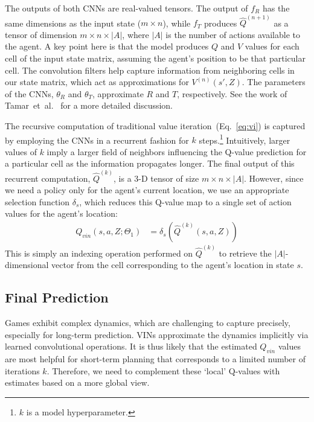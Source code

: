 The outputs of both CNNs are real-valued tensors. The output of $f_R$ has the same dimensions as the input state  ($m \times n$), while $f_T$ produces $\hat{Q}^{(n+1)}$ as a tensor of dimension $m \times n \times |A|$, where $|A|$ is the number of actions available to the agent. A key point here is that the model produces $Q$ and $V$ values for each cell of the input state matrix, assuming the agent's position to be that particular cell. The convolution filters help capture information from neighboring cells in our state matrix, which act as approximations for $V^{(n)}(s', Z)$. The parameters of the CNNs, $\theta_R$ and $\theta_T$, approximate $R$ and $T$, respectively. See the work of  Tamar~et~al.~\citeyear{tamar2016value} for a more detailed discussion.

The recursive computation of traditional value iteration~(Eq.~\ref{eq:vi}) is captured by employing the CNNs in a recurrent fashion for $k$ steps.\footnote{$k$ is a model hyperparameter.} Intuitively, larger values of $k$ imply a larger field of neighbors influencing the Q-value prediction for a particular cell as the information propagates longer. The final output of this recurrent computation, $\hat{Q}^{(k)}$, is a 3-D tensor of size $m \times n \times |A|$. However, since we need a policy only for the agent's current location, we use an appropriate selection function $\delta_s$, which reduces this Q-value map to a single set of action values for the agent's location:
\begin{align}
Q_{vin}(s, a, Z; \Theta_1) &=  \delta_s (\hat{Q}^{(k)} (s, a, Z))
\end{align}
This is simply an indexing operation performed on $\hat{Q}^{(k)}$ to retrieve the $|A|$-dimensional vector from the cell corresponding to the agent's location in state $s$.

\subsection{Final Prediction} 
Games exhibit complex dynamics, which are challenging to capture precisely, especially for long-term prediction. VINs approximate the dynamics implicitly via learned convolutional operations. It is thus likely that the estimated $Q_{vin}$ values are most helpful for short-term planning that corresponds to a limited number of iterations $k$. Therefore, we need to complement these `local' Q-values with estimates based on a more global view.

